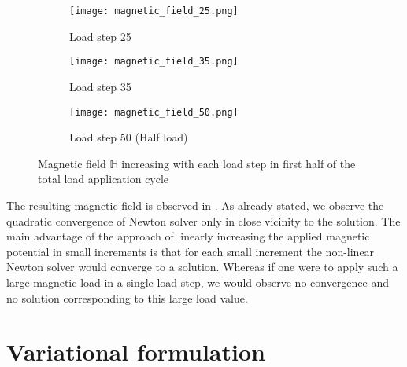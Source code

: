\begin{figure}[h]
\centering
\begin{subfigure}{0.32\textwidth}
\centering
\texttt{[image: magnetic\_field\_25.png]}
\caption{Load step 25}
\label{fig:3.7.1}
\end{subfigure}
\begin{subfigure}{0.32\textwidth}
\centering
\texttt{[image: magnetic\_field\_35.png]}
\caption{Load step 35}
\label{fig:3.7.2}
\end{subfigure}
\begin{subfigure}{0.32\textwidth}
\centering
\texttt{[image: magnetic\_field\_50.png]}
\caption{Load step 50 (Half load)}
\label{fig:3.7.3}
\end{subfigure}
\caption{Magnetic field $\mathbb{H}$ increasing with each load step in first half of the total load application cycle}
\label{fig:3.7}
\end{figure}

The resulting magnetic field is observed in . As already stated, we observe the quadratic convergence of Newton solver only in close vicinity to the solution. The main advantage of the approach of linearly increasing the applied magnetic potential in small increments is that for each small increment the non-linear Newton solver would converge to a solution. Whereas if one were to apply such a large magnetic load in a single load step, we would observe no convergence and no solution corresponding to this large load value. \par 

\section{Variational formulation}

